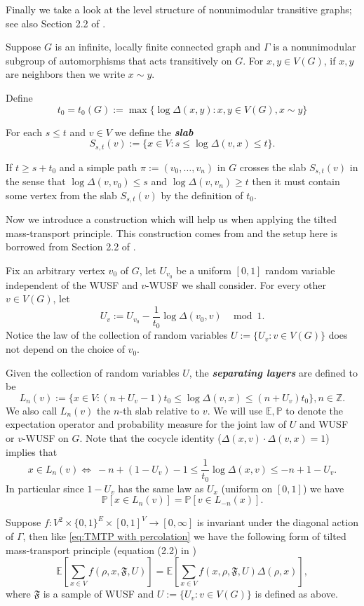 \documentclass[12pt]{article}
\numberwithin{equation}{section}
\newcommand{\be}{\begin{equation}}
\newcommand{\ee}{\end{equation}}
\newcommand{\1}{\mathbf{1}}
\newcommand{\notion}[1]{{\bf  \textit{#1}}}
\begin{document}
 Finally we take a look at the level structure of nonunimodular transitive graphs; see also Section 2.2 of \cite{Tom2017}. 

 Suppose $G$ is an infinite, locally finite connected graph and $\Gamma$ is a nonunimodular subgroup of automorphisms that acts transitively on $G$. For $x,y\in V(G)$,  if $x,y$ are neighbors then we write $x\sim y $.
 
 Define \[
 t_0=t_0(G):=\max \{\log\Delta(x,y): x,y\in V(G), x\sim y \} 
 \]
 
 For each $s\leq t$ and $v\in V$ we define the \notion{slab}
 \[
 S_{s,t}(v):=\{ x\in V: s\leq \log \Delta(v,x) \leq t    \}.
 \]
 
 If $t\geq s+t_0$ and a simple path $\pi:=(v_0,\ldots,v_n)$ in $G$ crosses the slab $S_{s,t}(v)$ in the sense that 
 $\log \Delta(v,v_0)\leq s$ and $\log \Delta(v,v_n)\geq t$ then it must contain some vertex from the slab $S_{s,t}(v)$ by the definition of $t_0$. 
 
 Now we introduce a construction which will help us when applying the tilted mass-transport principle. This construction comes from \cite{Timar2006} and the setup here is borrowed from Section 2.2 of \cite{Tom2017}. 
 
 Fix an arbitrary vertex $v_0$ of $G$, let $U_{v_0}$ be a uniform $[0,1]$ random variable independent of the WUSF and $v$-WUSF we shall consider. For every other $v\in V(G)$, let 
 \[
 U_v:=U_{v_0}-\frac{1}{t_0}\log \Delta(v_0,v)\ \ \mod 1.
 \]
 Notice the law of the collection of random variables $U:=\{U_v: v\in V(G) \}$ does not depend on the choice of $v_0$.
 
 Given the collection of random variables $U$, the \notion{separating layers} are defined to be 
 \[
 L_n(v):=\{x\in V: (n+U_v-1)t_0\leq \log\Delta(v,x) \leq (n+U_v)t_0  \},n\in\mathbb{Z}.
 \]
 We also call $L_n(v)$ the $n$-th slab relative to $v$. We will use $\mathbb{E},\mathbb{P}$ to denote the expectation operator and probability measure for the joint law of $U$  and WUSF or $v$-WUSF on $G$. Note that the cocycle identity ($\Delta(x,v)\cdot\Delta(v,x)=1$) implies that  
 \be\label{eq: relation for n and -n levels}
 x\in L_n(v) \Leftrightarrow\  -n+(1-U_v)-1\leq \frac{1}{t_0}\log\Delta(x,v)\leq -n+1-U_v.
 \ee
 In particular since $1-U_v$ has the same law as $U_x$ (uniform on $[0,1]$) we have  
 \be\label{eq: probability relation for n and -n levels}
 \mathbb{P}[x\in L_n(v)]=\mathbb{P}[v\in L_{-n}(x)].
 \ee
 
 Suppose $f:V^2\times\{0,1\}^E\times[0,1]^V\rightarrow[0,\infty]$ is invariant under the diagonal action of $\Gamma$, then like \eqref{eq:TMTP with percolation}  we have the following form of tilted mass-transport principle (equation (2.2) in \cite{Tom2017})
 \be\label{eq: TMTP with lable on vertices}
 \mathbb{E}\left[\sum_{x\in V}f(\rho,x,\mathfrak{F},U)\right]=\mathbb{E}\left[\sum_{x\in V}f(x,\rho,\mathfrak{F},U)\Delta(\rho,x)\right],
 \ee
 where $\mathfrak{F}$ is a sample of WUSF and $U:=\{U_v: v\in V(G) \}$ is defined as above.
 
\end{document}
